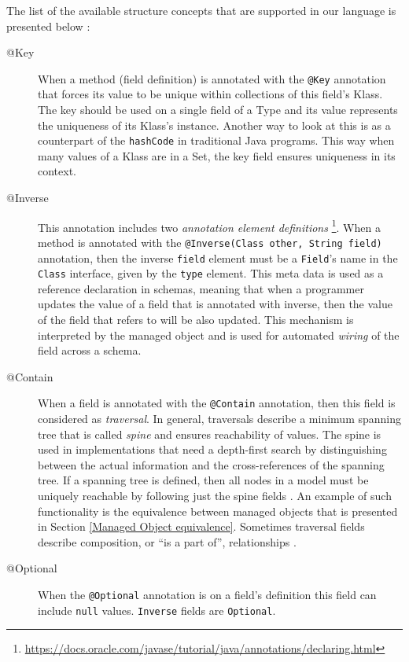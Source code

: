 The list of the available structure concepts that are supported in our language is presented below \cite{loh2012managed}:
\begin{description}
	\item [@Key] When a method (field definition) is annotated with the \texttt{@Key} annotation that forces its value to be unique within collections of this field's Klass.
	The key should be used on a single field of a Type and its value represents the uniqueness of its Klass's instance.
	Another way to look at this is as a counterpart of the \texttt{hashCode} in traditional Java programs.
	This way when many values of a Klass are in a Set, the key field ensures uniqueness in its context.

	\item [@Inverse] This annotation includes two \textit{annotation element definitions} \footnote{
		\url{https://docs.oracle.com/javase/tutorial/java/annotations/declaring.html}}.
	When a method is annotated with the \texttt{@Inverse(Class other, String field)} annotation, then the inverse \texttt{field} element must be a \texttt{Field}'s name in the \texttt{Class} interface, given by the \texttt{type} element.
	This meta data is used as a reference declaration in schemas, meaning that when a programmer updates the value of a field that is annotated with inverse, then the value of the field that refers to will be also updated.
	This mechanism is interpreted by the managed object and is used for automated \textit{wiring} of the field across a schema.

	\item [@Contain] When a field is annotated with the \texttt{@Contain} annotation, then this field is considered as \textit{traversal}. 
	In general, traversals describe a minimum spanning tree that is called \textit{spine} and ensures reachability of values.
	The spine is used in implementations that need a depth-first search by distinguishing between the actual information and the cross-references of the spanning tree.
	If a spanning tree is defined, then all nodes in a model must be uniquely reachable by following just the spine fields \cite{storm2012object}.
	An example of such functionality is the equivalence between managed objects that is presented in Section \ref{Managed Object equivalence}.
	Sometimes traversal fields describe composition, or ``is a part of'', relationships \cite{loh2012managed}.

	\item [@Optional] When the \texttt{@Optional} annotation is on a field's definition this field can include \texttt{null} values.
	\texttt{Inverse} fields are \texttt{Optional}. 


\end{description}
